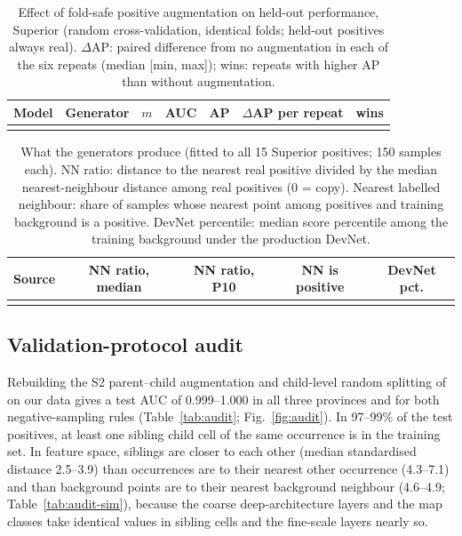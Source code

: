 \documentclass[pdflatex,sn-apa]{sn-jnl}
\begin{document}
\begin{table}[t]
\caption{Effect of fold-safe positive augmentation on held-out performance, Superior (random cross-validation, identical folds; held-out positives always real). $\Delta$AP: paired difference from no augmentation in each of the six repeats (median [min, max]); wins: repeats with higher AP than without augmentation.}\label{tab:augmentation}
\scriptsize
\setlength{\tabcolsep}{2.5pt}
\begin{tabular*}{\textwidth}{@{\extracolsep\fill}lllcccc}
\toprule
Model & Generator & $m$ & AUC & AP & $\Delta$AP per repeat & wins \\
\midrule
\botrule
\end{tabular*}
\end{table}

\begin{table}[t]
\caption{What the generators produce (fitted to all 15 Superior positives; 150 samples each). NN ratio: distance to the nearest real positive divided by the median nearest-neighbour distance among real positives (0 = copy). Nearest labelled neighbour: share of samples whose nearest point among positives and training background is a positive. DevNet percentile: median score percentile among the training background under the production DevNet.}\label{tab:aug-diag}
\footnotesize
\setlength{\tabcolsep}{2.5pt}
\begin{tabular*}{\textwidth}{@{\extracolsep\fill}lcccc}
\toprule
Source & NN ratio, median & NN ratio, P10 & NN is positive & DevNet pct. \\
\midrule
\botrule
\end{tabular*}
\end{table}

\subsection{Validation-protocol audit}\label{sec:res-audit}

Rebuilding the S2 parent--child augmentation and child-level random splitting of \citet{Parsa2024} on our data gives a test AUC of 0.999--1.000 in all three provinces and for both negative-sampling rules (Table~\ref{tab:audit}; Fig.~\ref{fig:audit}). In 97--99\% of the test positives, at least one sibling child cell of the same occurrence is in the training set. In feature space, siblings are closer to each other (median standardised distance 2.5--3.9) than occurrences are to their nearest other occurrence (4.3--7.1) and than background points are to their nearest background neighbour (4.6--4.9; Table~\ref{tab:audit-sim}), because the coarse deep-architecture layers and the map classes take identical values in sibling cells and the fine-scale layers nearly so.
\end{document}
